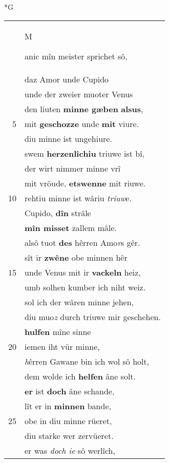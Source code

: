 \documentclass[8pt,a4paper,notitlepage]{article}
\begin{document}
\newpage
\begin{table}[ht]
\begin{minipage}[t]{0.5\linewidth}
\small
\begin{center}*G
\end{center}
\begin{tabular}{rl}
 & \begin{large}M\end{large}anic mîn meister sprichet sô,\\ 
 & daz Amor unde Cupido\\ 
 & unde der zweier muoter Venus\\ 
 & den liuten \textbf{minne gæben} \textbf{alsus},\\ 
5 & mit \textbf{geschozze} unde \textbf{mit} viure.\\ 
 & diu minne ist ungehiure.\\ 
 & swem \textbf{herzenlîchiu} triuwe ist bî,\\ 
 & der wirt nimmer minne vrî\\ 
 & mit vröude, \textbf{etswenne} mit riuwe.\\ 
10 & rehtiu minne ist wâriu \textit{triuw}e.\\ 
 & Cupido, \textbf{dîn} strâle\\ 
 & \textbf{mîn misset} zallem mâle.\\ 
 & alsô tuot \textbf{des} hêrren Amo\textit{r}s gêr.\\ 
 & sît ir \textbf{zwêne} obe minnen hêr\\ 
15 & unde Venus mit ir \textbf{vackeln} heiz,\\ 
 & umb solhen kumber ich niht weiz.\\ 
 & sol ich der wâren minne jehen,\\ 
 & diu muo\textit{z} durch triuwe mir geschehen.\\ 
 & \textbf{hulfen} mîne sinne\\ 
20 & iemen iht vür minne,\\ 
 & \textit{h}êrren Gawane bin ich wol sô holt,\\ 
 & dem wolde ich \textbf{helfen} âne solt.\\ 
 & \textbf{er} ist \textbf{doch} âne schande,\\ 
 & lît er in \textbf{minnen} bande,\\ 
25 & obe in diu minne rüeret,\\ 
 & diu starke wer zervüeret.\\ 
 & er was \textit{doch ie} sô werlîch,\\ 

\end{tabular}
\end{minipage}
\end{table}
\end{document}
